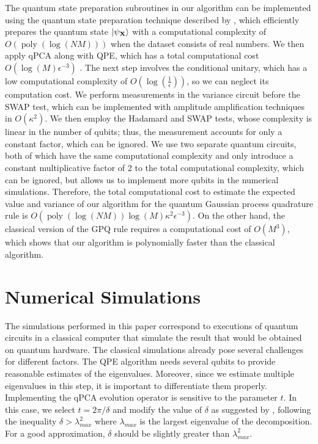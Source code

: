 \documentclass[10pt]{article}
\begin{document}
	The quantum state preparation subroutines in our algorithm can be implemented using the quantum state preparation technique described by \citet{Nakaji2022ApproximateAmplitudeEncoding}, which efficiently prepares the quantum state $\ket{\psi_\mathbf{X}}$ with a computational complexity of $O(\operatorname{poly}(\log (NM)))$ when the dataset consists of real numbers. We then apply qPCA along with QPE, which has a total computational cost $O(\log(M)\epsilon^{-3})$ \citep{Schuld2016QLinearRegresion}. The next step involves the conditional unitary, which has a low computational complexity of $O(\log(\frac{1}{\epsilon}))$, so we can neglect its computation cost. We perform measurements in the variance circuit before the SWAP test, which can be implemented with amplitude amplification techniques in $O(\kappa^2)$. We then employ the Hadamard and SWAP tests, whose complexity is linear in the number of qubits; thus, the measurement accounts for only a constant factor, which can be ignored. We use two separate quantum circuits, both of which have the same computational complexity and only introduce a constant multiplicative factor of $2$ to the total computational complexity, which can be ignored, but allows us to implement more qubits in the numerical simulations. Therefore, the total computational cost to estimate the expected value and variance of our algorithm for the quantum Gaussian process quadrature rule is $O(\operatorname{poly}(\log (NM))\log(M) \kappa^2 \epsilon^{-3})$. On the other hand, the classical version of the GPQ rule requires a computational cost of $O(M^3)$, which shows that our algorithm is polynomially faster than the classical algorithm.
	
	\section{\label{sec: Simulations}Numerical Simulations}
	The simulations performed in this paper correspond to executions of quantum circuits in a classical computer that simulate the result that would be obtained on quantum hardware. The classical simulations already pose several challenges for different factors. The QPE algorithm needs several qubits to provide reasonable estimates of the eigenvalues. Moreover, since we estimate multiple eigenvalues in this step, it is important to differentiate them properly. Implementing the qPCA evolution operator is sensitive to the parameter $t$. In this case, we select $t = 2\pi/\delta$ and modify the value of $\delta$ as suggested by \citet{Cleve1998QAR}, following the inequality $\delta > \lambda_{max}^2$ where $\lambda_{max}$ is the largest eigenvalue of the decomposition. For a good approximation, $\delta$ should be slightly greater than $\lambda_{max}^2$. 
	
\end{document}
